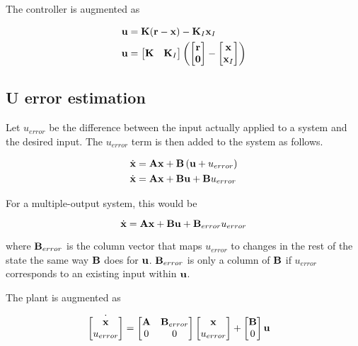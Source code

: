 The controller is augmented as

\begin{align*}
  \mathbf{u} &= \mathbf{K} (\mathbf{r} - \mathbf{x}) - \mathbf{K}_I\mathbf{x}_I \\
  \mathbf{u} &=
  \begin{bmatrix}
    \mathbf{K} & \mathbf{K}_I
  \end{bmatrix}
  \left(\begin{bmatrix}
    \mathbf{r} \\
    \mathbf{0}
  \end{bmatrix} -
  \begin{bmatrix}
    \mathbf{x} \\
    \mathbf{x}_I
  \end{bmatrix}\right)
\end{align*}

\subsection{U error estimation}

Let $u_{error}$ be the difference between the input actually applied to a system
and the desired input. The $u_{error}$ term is then added to the system as
follows.

\begin{align*}
  \dot{\mathbf{x}} &= \mathbf{A}\mathbf{x} + \mathbf{B}\left(\mathbf{u} + u_{error}\right) \\
  \dot{\mathbf{x}} &= \mathbf{A}\mathbf{x} + \mathbf{B}\mathbf{u} + \mathbf{B}u_{error}
\end{align*}

For a multiple-output system, this would be

\begin{equation*}
  \dot{\mathbf{x}} = \mathbf{A}\mathbf{x} + \mathbf{B}\mathbf{u} + \mathbf{B}_{error}u_{error}
\end{equation*}

where $\mathbf{B}_{error}$ is the column vector that maps $u_{error}$ to changes in
the rest of the state the same way $\mathbf{B}$ does for $\mathbf{u}$.
$\mathbf{B}_{error}$ is only a column of $\mathbf{B}$ if $u_{error}$ corresponds to an
existing input within $\mathbf{u}$.

The plant is augmented as

\begin{align*}
  \dot{\begin{bmatrix}
    \mathbf{x} \\
    u_{error}
  \end{bmatrix}} &=
  \begin{bmatrix}
    \mathbf{A} & \mathbf{B}_{error} \\
    0 & 0
  \end{bmatrix}
  \begin{bmatrix}
    \mathbf{x} \\
    u_{error}
  \end{bmatrix} +
  \begin{bmatrix}
    \mathbf{B} \\
    0
  \end{bmatrix}
  \mathbf{u}
\end{align*}

